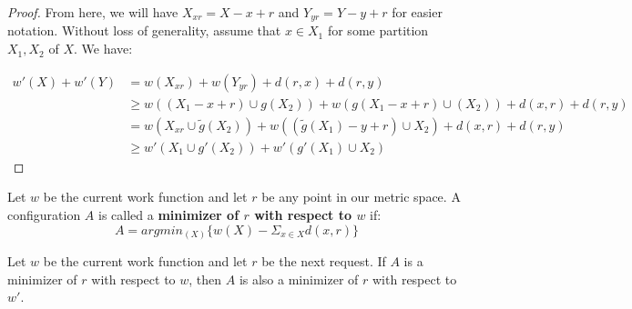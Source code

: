 \begin{proof}
    From here, we will have $X_{xr} = X - x + r$ and $Y_{yr} = Y - y + r$ for easier notation. Without loss of generality, assume that $x \in X_1$ for some partition $X_1, X_2$ of $X$. We have:

    \begin{equation*}
        \begin{split}
            w'(X) + w'(Y) &= w(X_{xr}) + w(Y_{yr}) + d(r, x) + d(r, y) \\
            &\geq w((X_1-x+r) \cup g(X_2)) + w(g(X_1-x+r) \cup (X_2)) + d(x, r) + d(r, y) \\
            &= w(X_{xr} \cup \tilde{g}(X_2)) + w((\tilde{g}(X_1) -y + r) \cup X_2) + d(x, r) + d(r, y) \\
            &\geq w'(X_1 \cup g'(X_2)) + w'(g'(X_1) \cup X_2) 
        \end{split}
    \end{equation*}
\end{proof}

\begin{definition}
    Let $w$ be the current work function and let $r$ be any point in our metric space. A configuration $A$ is called a \textbf{minimizer of $r$ with respect to $w$} if:
    \begin{equation*}
        A = argmin_{(X)} \{ w(X) - \Sigma_{x \in X} d(x,r)\}
    \end{equation*}
\end{definition}

\begin{lemma}
    \label{lem:min}
    Let $w$ be the current work function and let $r$ be the next request. If $A$ is a minimizer of $r$ with respect to $w$, then $A$ is also a minimizer of $r$ with respect to $w'$.
\end{lemma}

